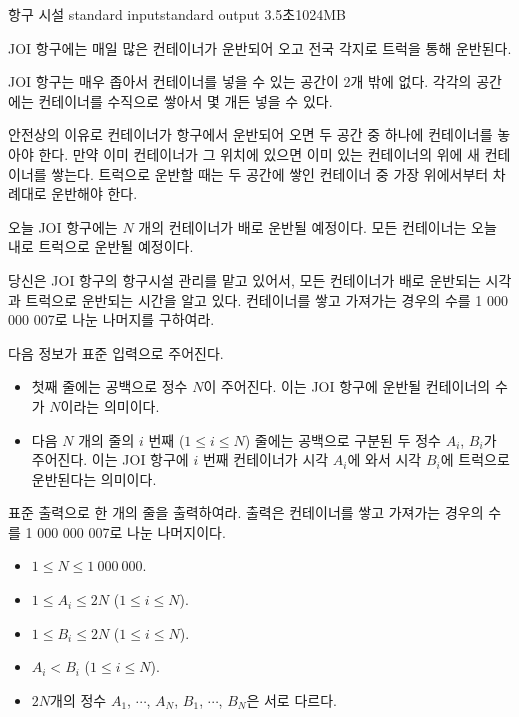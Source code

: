 \begin{problem}{항구 시설}
	{standard input}{standard output}
	{3.5초}{1024MB}{}
	
	JOI 항구에는 매일 많은 컨테이너가 운반되어 오고 전국 각지로 트럭을 통해 운반된다.
	
	JOI 항구는 매우 좁아서 컨테이너를 넣을 수 있는 공간이 2개 밖에 없다. 각각의 공간에는 컨테이너를 수직으로 쌓아서 몇 개든 넣을 수 있다.
	
	안전상의 이유로 컨테이너가 항구에서 운반되어 오면 두 공간 중 하나에 컨테이너를 놓아야 한다. 만약 이미 컨테이너가 그 위치에 있으면 이미 있는 컨테이너의 위에 새 컨테이너를 쌓는다. 트럭으로 운반할 때는 두 공간에 쌓인 컨테이너 중 가장 위에서부터 차례대로 운반해야 한다.
	
	오늘 JOI 항구에는 $N$ 개의 컨테이너가 배로 운반될 예정이다. 모든 컨테이너는 오늘 내로 트럭으로 운반될 예정이다.
	
	당신은 JOI 항구의 항구시설 관리를 맡고 있어서, 모든 컨테이너가 배로 운반되는 시각과 트럭으로 운반되는 시간을 알고 있다. 컨테이너를 쌓고 가져가는 경우의 수를 1 000 000 007로 나눈 나머지를 구하여라.
	
	\InputFile

다음 정보가 표준 입력으로 주어진다.

\begin{itemize}
	\item 첫째 줄에는 공백으로 정수 $N$이 주어진다. 이는 JOI 항구에 운반될 컨테이너의 수가 $N$이라는 의미이다.
	\item 다음 $N$ 개의 줄의 $i$ 번째 ($1 \le i \le N$) 줄에는 공백으로 구분된 두 정수 $A_i$, $B_i$가 주어진다. 이는 JOI 항구에 $i$ 번째 컨테이너가 시각 $A_i$에 와서 시각 $B_i$에 트럭으로 운반된다는 의미이다.
\end{itemize}


\OutputFile

표준 출력으로 한 개의 줄을 출력하여라. 출력은 컨테이너를 쌓고 가져가는 경우의 수를 1 000 000 007로 나눈 나머지이다.

\Constraints

\begin{itemize}
	
	\item $1 \le N \le 1\ 000\ 000$.
	\item $1 \le A_i \le 2N$ ($1 \le i \le N$).
	\item $1 \le B_i \le 2N$ ($1 \le i \le N$).
	\item $A_i < B_i$ ($1 \le i \le N$).
	\item $2N$개의 정수 $A_1$, $\cdots$, $A_N$, $B_1$, $\cdots$, $B_N$은 서로 다르다.	
\end{itemize}



\end{problem}

